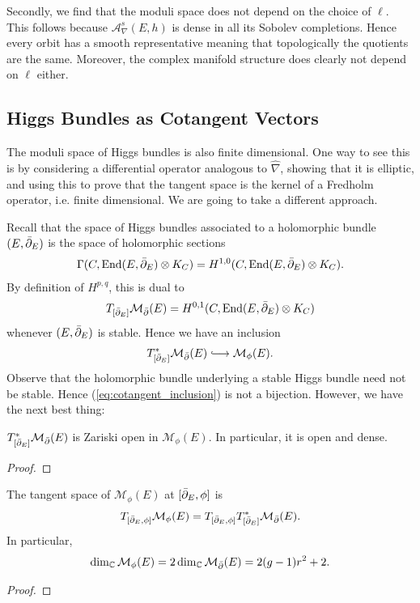 \documentclass[12pt]{ociamthesis}  %
\begin{document}
Secondly, we find that the moduli space does not depend on the
choice of $\ell$. This follows because $\mathcal A_\nabla^{s}(E,h)$
is dense in all its Sobolev completions. Hence every orbit has a
smooth representative meaning that topologically the quotients are
the same. Moreover, the complex manifold structure does clearly
not depend on $\ell$ either.

\subsection{Higgs Bundles as Cotangent Vectors}

The moduli space of Higgs bundles is also finite dimensional. One way to
see this is by considering a differential operator analogous to $\hat\nabla$,
showing that it is elliptic, and using this to prove that the
tangent space is the kernel of a Fredholm operator, i.e. finite
dimensional. We are going to take a different approach.

Recall that the space of Higgs bundles associated to a holomorphic
bundle $(E,\bar{\partial}_E)$ is the space of holomorphic sections
\begin{align*}
  \Gamma(C,\operatorname{End}(E,\bar{\partial}_E) \otimes K_C) = H^{1,0}(C,\operatorname{End}(E,\bar{\partial}_E)\otimes K_C).
\end{align*}
By definition of $H^{p,q}$, this is dual to
\begin{align*}
  T_{[\bar{\partial}_E]}\mathcal M_{\bar{\partial}}(E) = H^{0,1}(C,\operatorname{End}(E,\bar{\partial}_E)\otimes K_C)
\end{align*}
whenever $(E,\bar{\partial}_E)$ is stable. Hence we have an inclusion
\begin{align}\label{eq:cotangent_inclusion}
  T_{[\dol_E]}^*\mathcal M_{\dol}(E) \longinc\mathcal M_\phi(E).
\end{align}
Observe that the holomorphic bundle underlying a stable Higgs bundle need
not be stable. Hence (\ref{eq:cotangent_inclusion}) is not a bijection.
However, we have the next best thing:

\begin{theorem}
  $T_{[\bar{\partial}_E]}^*\mathcal M_{\bar{\partial}}(E)$ is Zariski open in $\mathcal M_\phi(E)$.
  In particular, it is open and dense.
  \begin{proof}
    \missingproof
  \end{proof}
\end{theorem}

\begin{corollary}
  The tangent space of $\mathcal M_{\phi}(E)$ at $[\bar{\partial}_E,\phi]$
  is
  \begin{align*}
    T_{[\bar{\partial}_E,\phi]}\mathcal M_\phi(E) = T_{[\bar{\partial}_E,\phi]} T^*_{[\bar{\partial}_E]}\mathcal M_{\bar{\partial}}(E).
  \end{align*}
  In particular,
  \begin{align*}
    \dim_{\mathbb C}\mathcal M_{\phi}(E)
    =2\dim_{\mathbb C}\mathcal M_{\bar{\partial}}(E)
    =2(g-1)r^2 + 2.
  \end{align*}
  \begin{proof}
    \missingproof
  \end{proof}
\end{corollary}
\end{document}
